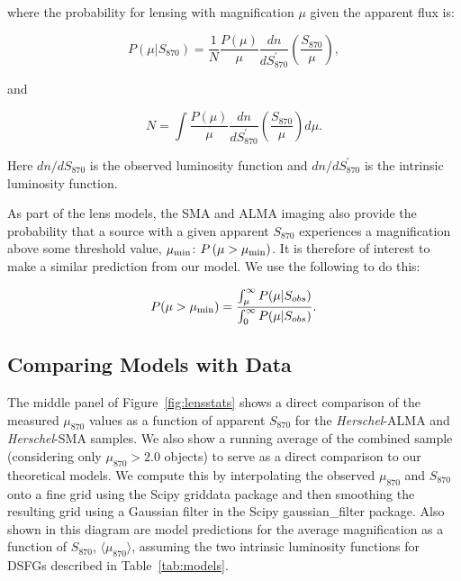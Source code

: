 \documentclass[iop]{emulateapj}
\begin{document}
\noindent where the probability for lensing with magnification $\mu$ given the
apparent flux is:

\begin{equation}
    P(\mu|S_{870}) = \frac{1}{N} \frac{P(\mu)}{\mu} \frac{dn}{dS_{870}^\prime}
\left(\frac{S_{870}}{\mu}\right),
\end{equation} 

\noindent and 

\begin{equation}
    N = \int \frac{P(\mu)}{\mu} \frac{dn}{dS_{870}^\prime}
    \left(\frac{S_{870}}{\mu}\right)d\mu.
\end{equation}

\noindent Here $ dn/dS_{870}$ is the observed luminosity function and
$dn/dS_{870}^\prime$ is the intrinsic luminosity function.

As part of the lens models, the SMA and ALMA imaging also provide the
probability that a source with a given apparent $S_{870}$ experiences a
magnification above some threshold value, $\mu_{\rm min}$: $P\,(\mu > \mu_{\rm
min})$.  It is therefore of interest to make a similar prediction from our
model.  We use the following to do this:

\begin{equation}
    P(\mu>\mu_{\rm min}) = \frac{\int_\mu^\infty P(\mu|S_{obs})}{\int_0^\infty
    P(\mu|S_{obs})}.
\end{equation}

\subsection{Comparing Models with Data}

The middle panel of Figure~\ref{fig:lensstats} shows a direct comparison of the
measured $\mu_{870}$ values as a function of apparent $S_{870}$ for the {\it
Herschel}-ALMA and {\it Herschel}-SMA samples.  We also show a running average
of the combined sample (considering only $\mu_{870} > 2.0$ objects) to serve as
a direct comparison to our theoretical models.  We compute this by
interpolating the observed $\mu_{870}$ and $S_{870}$ onto a fine grid using the
{\sc Scipy} {\sc griddata} package and then smoothing the resulting grid using
a Gaussian filter in the Scipy {\sc gaussian\_filter} package.
Also shown in this diagram are model predictions for the average magnification
as a function of $S_{870}$, $\langle\mu_{870}\rangle$, assuming the two
intrinsic luminosity functions for DSFGs described in Table~\ref{tab:models}.  
\end{document}
